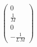 \begin{equation}
\left(\begin{array}{c} 0\\ \frac{1}{M}\\ 0\\ -\frac{1}{L\,M} \end{array}\right)
\end{equation}
